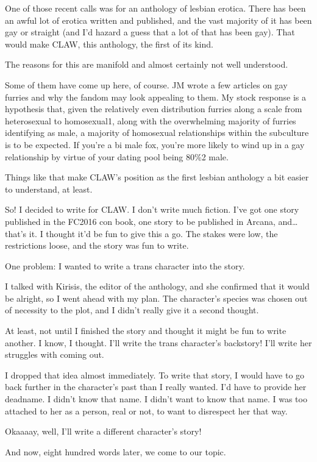 One of those recent calls was for an anthology of lesbian erotica. There has been an awful lot of erotica written and published, and the vast majority of it has been gay or straight (and I'd hazard a guess that a lot of that has been gay). That would make CLAW, this anthology, the first of its kind.

The reasons for this are manifold and almost certainly not well understood.

Some of them have come up here, of course. JM wrote a few articles on gay furries and why the fandom may look appealing to them. My stock response is a hypothesis that, given the relatively even distribution furries along a scale from heterosexual to homosexual1, along with the overwhelming majority of furries identifying as male, a majority of homosexual relationships within the subculture is to be expected. If you're a bi male fox, you're more likely to wind up in a gay relationship by virtue of your dating pool being 80\%2 male.

Things like that make CLAW's position as the first lesbian anthology a bit easier to understand, at least.

So! I decided to write for CLAW. I don't write much fiction. I've got one story published in the FC2016 con book, one story to be published in Arcana, and\ldots{}that's it. I thought it'd be fun to give this a go. The stakes were low, the restrictions loose, and the story was fun to write.

One problem: I wanted to write a trans character into the story.

I talked with Kirisis, the editor of the anthology, and she confirmed that it would be alright, so I went ahead with my plan. The character's species was chosen out of necessity to the plot, and I didn't really give it a second thought.

At least, not until I finished the story and thought it might be fun to write another. I know, I thought. I'll write the trans character's backstory! I'll write her struggles with coming out.

I dropped that idea almost immediately. To write that story, I would have to go back further in the character's past than I really wanted. I'd have to provide her deadname. I didn't know that name. I didn't want to know that name. I was too attached to her as a person, real or not, to want to disrespect her that way.

Okaaaay, well, I'll write a different character's story!

And now, eight hundred words later, we come to our topic.

